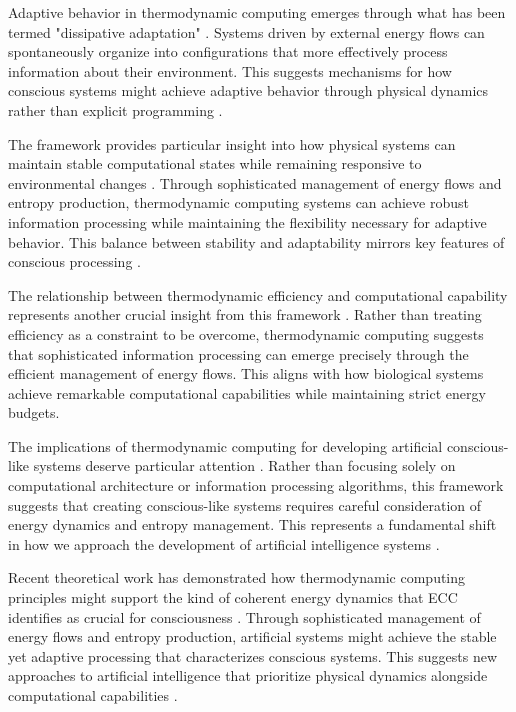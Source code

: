 Adaptive behavior in thermodynamic computing emerges through what has been termed "dissipative adaptation" \cite{Hinrichsen2019}. Systems driven by external energy flows can spontaneously organize into configurations that more effectively process information about their environment. This suggests mechanisms for how conscious systems might achieve adaptive behavior through physical dynamics rather than explicit programming \cite{Kolchinsky2020}.

The framework provides particular insight into how physical systems can maintain stable computational states while remaining responsive to environmental changes \cite{Maroney2019}. Through sophisticated management of energy flows and entropy production, thermodynamic computing systems can achieve robust information processing while maintaining the flexibility necessary for adaptive behavior. This balance between stability and adaptability mirrors key features of conscious processing \cite{Parrondo2017}.

The relationship between thermodynamic efficiency and computational capability represents another crucial insight from this framework \cite{Perunov2020}. Rather than treating efficiency as a constraint to be overcome, thermodynamic computing suggests that sophisticated information processing can emerge precisely through the efficient management of energy flows. This aligns with how biological systems achieve remarkable computational capabilities while maintaining strict energy budgets.

The implications of thermodynamic computing for developing artificial conscious-like systems deserve particular attention \cite{Sagawa2018}. Rather than focusing solely on computational architecture or information processing algorithms, this framework suggests that creating conscious-like systems requires careful consideration of energy dynamics and entropy management. This represents a fundamental shift in how we approach the development of artificial intelligence systems \cite{Still2020}.

Recent theoretical work has demonstrated how thermodynamic computing principles might support the kind of coherent energy dynamics that ECC identifies as crucial for consciousness \cite{Wolpert2019}. Through sophisticated management of energy flows and entropy production, artificial systems might achieve the stable yet adaptive processing that characterizes conscious systems. This suggests new approaches to artificial intelligence that prioritize physical dynamics alongside computational capabilities \cite{Yoshimura2021}.

